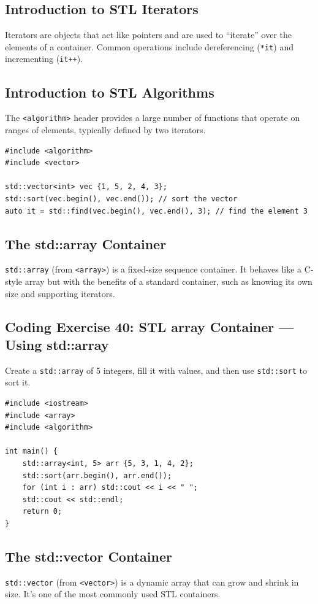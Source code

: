 \subsection{Introduction to STL Iterators}
Iterators are objects that act like pointers and are used to ``iterate'' over the elements of a container. Common operations include dereferencing (\texttt{*it}) and incrementing (\texttt{it++}).

\subsection{Introduction to STL Algorithms}
The \texttt{<algorithm>} header provides a large number of functions that operate on ranges of elements, typically defined by two iterators.
\begin{lstlisting}
#include <algorithm>
#include <vector>

std::vector<int> vec {1, 5, 2, 4, 3};
std::sort(vec.begin(), vec.end()); // sort the vector
auto it = std::find(vec.begin(), vec.end(), 3); // find the element 3
\end{lstlisting}

\subsection{The std::array Container}
\texttt{std::array} (from \texttt{<array>}) is a fixed-size sequence container. It behaves like a C-style array but with the benefits of a standard container, such as knowing its own size and supporting iterators.

\subsection{Coding Exercise 40: STL array Container --- Using std::array}
Create a \texttt{std::array} of 5 integers, fill it with values, and then use \texttt{std::sort} to sort it.
\begin{lstlisting}
#include <iostream>
#include <array>
#include <algorithm>

int main() {
	std::array<int, 5> arr {5, 3, 1, 4, 2};
	std::sort(arr.begin(), arr.end());
	for (int i : arr) std::cout << i << " ";
	std::cout << std::endl;
	return 0;
}
\end{lstlisting}

\subsection{The std::vector Container}
\texttt{std::vector} (from \texttt{<vector>}) is a dynamic array that can grow and shrink in size. It's one of the most commonly used STL containers.

